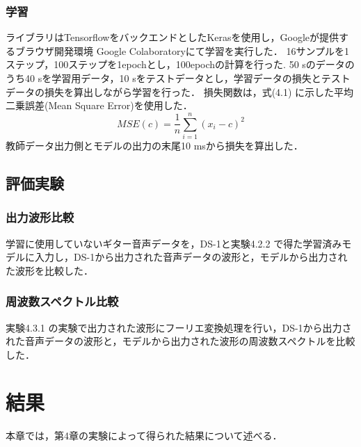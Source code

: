 \documentclass{jreport}		%
\begin{document}
\subsection{学習}
ライブラリはTensorflowをバックエンドとしたKerasを使用し，Googleが提供するブラウザ開発環境 Google Colaboratoryにて学習を実行した．
16サンプルを1ステップ，100ステップを1epochとし，100epochの計算を行った.
50 sのデータのうち40 sを学習用データ，10 sをテストデータとし，学習データの損失とテストデータの損失を算出しながら学習を行った．
損失関数は，式(4.1) に示した平均二乗誤差(Mean Square Error)を使用した．
\begin{equation}
  MSE(c) = \frac{1}{n}\sum_{i=1}^{n}(x_i-c)^2
\end{equation}
教師データ出力側とモデルの出力の末尾10 msから損失を算出した．

\section{評価実験}
\subsection{出力波形比較}
学習に使用していないギター音声データを，DS-1と実験4.2.2 で得た学習済みモデルに入力し，DS-1から出力された音声データの波形と，モデルから出力された波形を比較した．

\subsection{周波数スペクトル比較}
実験4.3.1 の実験で出力された波形にフーリエ変換処理を行い，DS-1から出力された音声データの波形と，モデルから出力された波形の周波数スペクトルを比較した．

\chapter{結果}
本章では，第4章の実験によって得られた結果について述べる．
\end{document}
